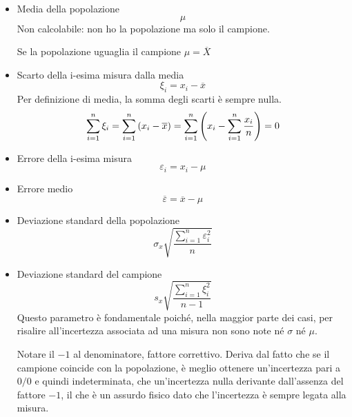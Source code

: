 \documentclass[a4paper, 15pt]{article}
\begin{document}
\begin{adjustwidth}{2in}{}
\begin{itemize}
 	 		\item Media della popolazione \newline 
 	 		\[\mu\]
 	 		Non calcolabile: non ho la popolazione ma solo il campione. 
 	 		
 	 		Se la popolazione uguaglia il campione \(\mu = \overline{X}\)
 	 		
 	 		\item Scarto della i-esima misura dalla media
 	 		\[\xi_i = x_i - \overline{x}\]
 	 		Per definizione di media, la somma degli scarti è sempre nulla. 
 	 		\[\sum_{i=1}^{n}\xi_i = \sum_{i=1}^{n}\left(x_i - \overline{x}\right) = \sum_{i=1}^{n}\left(x_i - \sum_{i=1}^{n}{x_i\over n}\right) = 0 \]
 	 		
 	 		\item Errore della i-esima misura
 	 		\[\varepsilon_i = x_i -\mu\]
 	 		
 	 		\item Errore medio
 	 		\[\overline{\varepsilon} = \overline{x} - \mu\]
 	 		
 	 		\item Deviazione standard della popolazione
 	 		\[\sigma_x \sqrt{\dfrac{\sum_{i=1}^{n}\varepsilon^2_i}{n}}\]
 	 		
 	 		\item Deviazione standard del campione
 	 		\[s_x \sqrt{\dfrac{\sum_{i=1}^{n}\xi^2_i}{n-1}}\]
 	 		Questo parametro è fondamentale poiché, nella maggior parte dei casi, per risalire all’incertezza associata ad una misura non sono note né $\sigma$ né $\mu$. \newline
 	 		
 	 		Notare il $-1$ al denominatore, fattore correttivo. Deriva dal fatto che se il campione coincide con la popolazione, è meglio ottenere un'incertezza pari a $0/0$ e quindi indeterminata, che un'incertezza nulla derivante dall'assenza del fattore $-1$, il che è un assurdo fisico dato che l'incertezza è sempre legata alla misura. 
 		\end{itemize}
 \end{adjustwidth}
 \newpage
\end{document}
